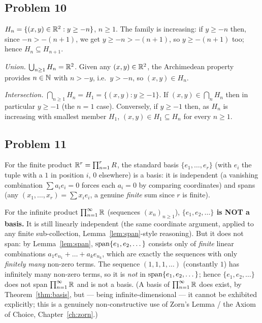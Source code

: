 \subsection*{Problem 10}
$H_n=\{(x,y)\in\mathbb{R}^2:y\ge-n\}$, $n\ge1$. The family is increasing: if $y\ge-n$ then, since $-n>-(n+1)$, we get $y\ge-n>-(n+1)$, so $y\ge-(n+1)$ too; hence $H_n\subseteq H_{n+1}$.

\emph{Union.} $\bigcup_{n\ge1}H_n=\mathbb{R}^2$. Given any $(x,y)\in\mathbb{R}^2$, the Archimedean property provides $n\in\mathbb{N}$ with $n>-y$, i.e.\ $y>-n$, so $(x,y)\in H_n$.

\emph{Intersection.} $\bigcap_{n\ge1}H_n=H_1=\{(x,y):y\ge-1\}$. If $(x,y)\in\bigcap_nH_n$ then in particular $y\ge-1$ (the $n=1$ case). Conversely, if $y\ge-1$ then, as $H_n$ is increasing with smallest member $H_1$, $(x,y)\in H_1\subseteq H_n$ for every $n\ge1$.

\subsection*{Problem 11}
For the finite product $\mathbb{R}^r=\prod_{n=1}^rR$, the standard basis $\{e_1,\dots,e_r\}$ (with $e_i$ the tuple with a $1$ in position $i$, $0$ elsewhere) is a basis: it is independent (a vanishing combination $\sum a_ie_i=0$ forces each $a_i=0$ by comparing coordinates) and spans (any $(x_1,\dots,x_r)=\sum x_ie_i$, a genuine \emph{finite} sum since $r$ is finite).

For the infinite product $\prod_{n=1}^\infty\mathbb{R}$ (sequences $(x_n)_{n\ge1}$), \textbf{$\{e_1,e_2,\dots\}$ is NOT a basis.} It is still linearly independent (the same coordinate argument, applied to any finite sub-collection, Lemma~\ref{lem:span}-style reasoning). But it does not span: by Lemma~\ref{lem:span}, $\operatorname{span}\{e_1,e_2,\dots\}$ consists only of \emph{finite} linear combinations $a_1e_{n_1}+\dots+a_ke_{n_k}$, which are exactly the sequences with only \emph{finitely many} non-zero terms. The sequence $(1,1,1,\dots)$ (constantly $1$) has infinitely many non-zero terms, so it is \emph{not} in $\operatorname{span}\{e_1,e_2,\dots\}$; hence $\{e_1,e_2,\dots\}$ does not span $\prod_{n=1}^\infty\mathbb{R}$ and is not a basis. (A basis of $\prod_{n=1}^\infty\mathbb{R}$ does exist, by Theorem~\ref{thm:basis}, but — being infinite-dimensional — it cannot be exhibited explicitly; this is a genuinely non-constructive use of Zorn's Lemma / the Axiom of Choice, Chapter~\ref{ch:zorn}.)


